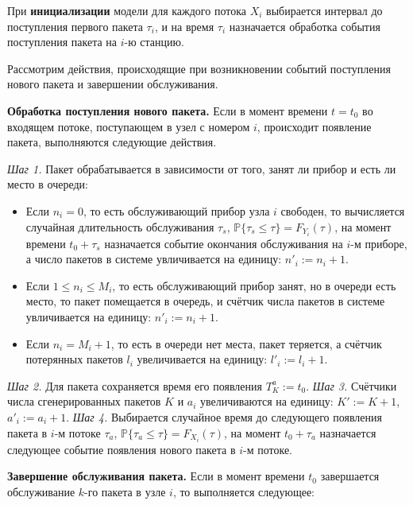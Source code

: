 При \textbf{инициализации} модели для каждого потока $X_i$ выбирается интервал до поступления первого пакета $\tau_i$, и на время $\tau_i$ назначается обработка события поступления пакета на $i$-ю станцию.

Рассмотрим действия, происходящие при возникновении событий поступления нового пакета и завершении обслуживания.

\textbf{Обработка поступления нового пакета.} Если в момент времени $t = t_0$ во входящем потоке, поступающем в узел с номером $i$, происходит появление пакета, выполняются следующие действия.

\textit{Шаг 1.} Пакет обрабатывается в зависимости от того, занят ли прибор и есть ли место в очереди:
\begin{itemize}
  \item Если $n_i = 0$, то есть обслуживающий прибор узла $i$ свободен, то вычисляется случайная длительность обслуживания $\tau_s$, $\mathbb{P}\{\tau_s \leqslant \tau\} = F_{Y_i}(\tau)$, на момент времени $t_0 + \tau_s$ назначается событие окончания обслуживания на $i$-м приборе, а число пакетов в системе увличивается на единицу: $n'_i := n_i + 1$.
  \item Если $1 \leqslant n_i \leqslant M_i$, то есть обслуживающий прибор занят, но в очереди есть место, то пакет помещается в очередь, и счётчик числа пакетов в системе увличивается на единицу: $n'_i := n_i + 1$.
  \item Если $n_i = M_i + 1$, то есть в очереди нет места, пакет теряется, а счётчик потерянных пакетов $l_i$ увеличивается на единицу: $l'_i := l_i + 1$.
\end{itemize}

\textit{Шаг 2.} Для пакета сохраняется время его появления $T_K^a := t_0$.
\textit{Шаг 3.} Счётчики числа сгенерированных пакетов $K$ и $a_i$ увеличиваются на единицу: $K' := K + 1$, $a'_i := a_i + 1$.
\textit{Шаг 4.} Выбирается случайное время до следующего появления пакета в $i$-м потоке $\tau_a$, $\mathbb{P}\{ \tau_a \leqslant \tau \} = F_{X_i}(\tau)$, на момент $t_0 + \tau_a$ назначается следующее событие появления нового пакета в $i$-м потоке.

\textbf{Завершение обслуживания пакета.} Если в момент времени $t_0$ завершается обслуживание $k$-го пакета в узле $i$, то выполняется следующее:

